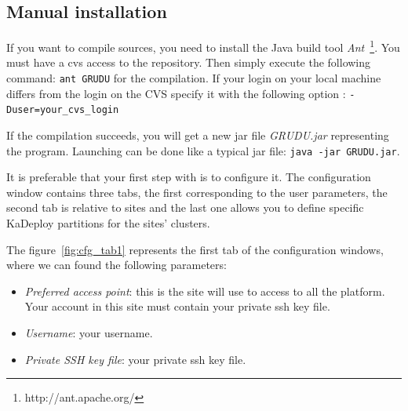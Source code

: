 % 
% 

\subsection{Manual installation}

If you want to compile \grudu sources, you need to install the Java build
tool \textit{Ant}~\footnote{http://ant.apache.org/}. You must have a cvs access
to the \grudu repository. Then simply execute the following command: \verb|ant GRUDU|
 for the compilation. If your login on your local machine differs from the
login on the CVS specify it with the following option : \verb|-Duser=your_cvs_login|

If the compilation succeeds, you will get a new jar file
\textit{GRUDU.jar} representing the program. Launching \grudu can be
done like a typical jar file: \verb|java -jar GRUDU.jar|.

It is preferable that your first step with \grudu is to configure
it. The configuration window contains three tabs, the first corresponding
to the user parameters, the second tab is relative to \gfk sites
and the last one allows you to define specific KaDeploy partitions for the
sites' clusters.

The figure~\ref{fig:cfg_tab1} represents the first tab of the 
configuration windows, where we can found the following parameters:
\begin{itemize}
  \item \textit{Preferred access point}: this is the \gfk site \grudu will
  use to access to all the platform. Your account in this site must
  contain your private ssh key file.
  \item \textit{Username}: your \gfk username.
  \item \textit{Private SSH key file}: your private ssh key file.
\end{itemize}


